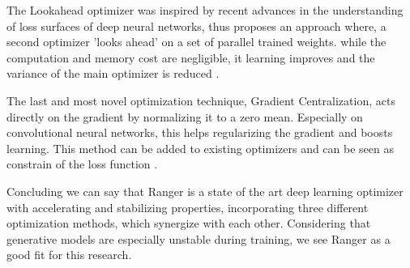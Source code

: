 The Lookahead optimizer was inspired by recent advances in the understanding of loss surfaces of deep neural networks, thus proposes an approach where, a second optimizer 'looks ahead' on a set of parallel trained weights. while the computation and memory cost are negligible, it learning improves and the variance of the main optimizer is reduced \cite{zhang_lookahead_2019}.

The last and most novel optimization technique, Gradient Centralization, acts directly on the gradient by normalizing it to a zero mean. Especially on convolutional neural networks, this helps regularizing the gradient and boosts learning. This method can be added to existing optimizers and can be seen as constrain of the loss function \cite{yong_gradient_2020}.

Concluding we can say that Ranger is a state of the art deep learning optimizer with accelerating and stabilizing properties, incorporating three different optimization methods, which synergize with each other. Considering that generative models are especially unstable during training, we see Ranger as a good fit for this research.



